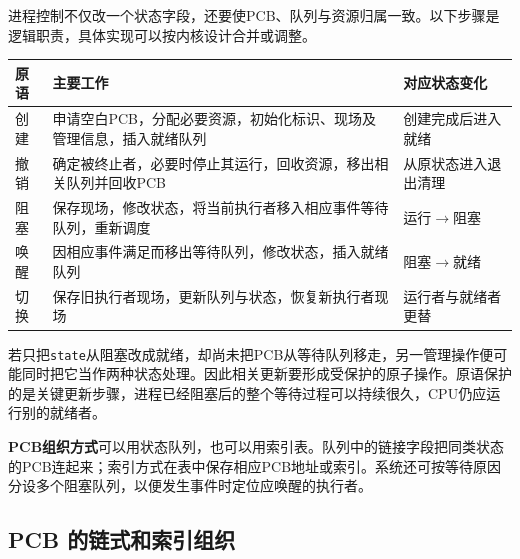 进程控制不仅改一个状态字段，还要使PCB、队列与资源归属一致。以下步骤是逻辑职责，具体实现可以按内核设计合并或调整。

\par\medskip\noindent\begin{minipage}{\linewidth}\fontsize{9.3}{12}\selectfont\begin{tabularx}{\linewidth}{@{}YYY@{}}
\toprule\noalign{}
\begin{minipage}[b]{\linewidth}\raggedright
原语
\end{minipage} & \begin{minipage}[b]{\linewidth}\raggedright
主要工作
\end{minipage} & \begin{minipage}[b]{\linewidth}\raggedright
对应状态变化
\end{minipage} \\
\midrule\noalign{}


创建 & 申请空白PCB，分配必要资源，初始化标识、现场及管理信息，插入就绪队列 & 创建完成后进入就绪 \\
撤销 & 确定被终止者，必要时停止其运行，回收资源，移出相关队列并回收PCB & 从原状态进入退出清理 \\
阻塞 & 保存现场，修改状态，将当前执行者移入相应事件等待队列，重新调度 & 运行\ensuremath{\to}阻塞 \\
唤醒 & 因相应事件满足而移出等待队列，修改状态，插入就绪队列 & 阻塞\ensuremath{\to}就绪 \\
切换 & 保存旧执行者现场，更新队列与状态，恢复新执行者现场 & 运行者与就绪者更替 \\
\bottomrule\end{tabularx}
\end{minipage}\par\medskip

若只把\texttt{state}从阻塞改成就绪，却尚未把PCB从等待队列移走，另一管理操作便可能同时把它当作两种状态处理。因此相关更新要形成受保护的原子操作。原语保护的是关键更新步骤，进程已经阻塞后的整个等待过程可以持续很久，CPU仍应运行别的就绪者。

\textbf{PCB组织方式}可以用状态队列，也可以用索引表。队列中的链接字段把同类状态的PCB连起来；索引方式在表中保存相应PCB地址或索引。系统还可按等待原因分设多个阻塞队列，以便发生事件时定位应唤醒的执行者。

\subsection{PCB 的链式和索引组织}\label{OS02-course-pcb-organization}


